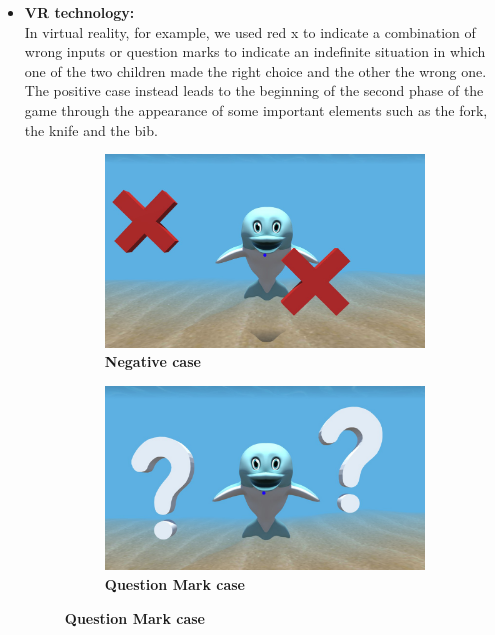 \documentclass [12pt]{article}
\begin{document}
\begin{itemize}[•]
\item \textbf{VR technology:}\\
In virtual reality, for example, we used red x to indicate a combination of wrong inputs or question marks to indicate an indefinite situation in which one of the two children made the right choice and the other the wrong one. The positive case instead leads to the beginning of the second phase of the game through the appearance of some important elements such as the fork, the knife and the bib.
\begin{figure}[h!]
\centering
\hspace*{\fill}
\begin{subfigure}[tl]{0.3\linewidth}
\includegraphics[width=\linewidth]{NegativeCase.jpg}
\caption{\textbf{Negative case}}
\end{subfigure}\hfill
\begin{subfigure}[tr]{0.3\linewidth}
\includegraphics[width=\linewidth]{QuestionMarkCase.jpg}
\caption{\textbf{Question Mark case}}
\end{subfigure}

\end{figure}
\end{itemize}
\end{document}
